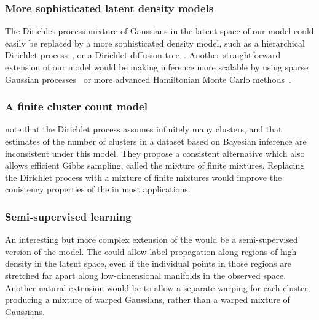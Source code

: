 \subsubsection{More sophisticated latent density models}
The Dirichlet process mixture of Gaussians in the latent space of our model could easily be replaced by a more sophisticated density model, such as a hierarchical Dirichlet process~\citep{teh2006hierarchical}, or a Dirichlet diffusion tree~\citep{neal2003density}.
Another straightforward extension of our model would be making inference more scalable by using sparse Gaussian processes~\citep{quinonero2005unifying,snelson2006sparse} or more advanced Hamiltonian Monte Carlo methods~\citep{zhang2011quasi}.


\subsubsection{A finite cluster count model}
\citet{miller2013inconsistent} note that the Dirichlet process assumes infinitely many clusters, and that estimates of the number of clusters in a dataset based on Bayesian inference are inconsistent under this model.
They propose a consistent alternative which also allows efficient Gibbs sampling, called the mixture of finite mixtures.
Replacing the Dirichlet process with a mixture of finite mixtures would improve the conistency properties of the \iwmm{} in most applications.




\subsubsection{Semi-supervised learning}

An interesting but more complex extension of the \iwmm{} would be a semi-supervised version of the model.
The \iwmm{} could allow label propagation along regions of high density in the latent space, even if the individual points in those regions are stretched far apart along low-dimensional manifolds in the observed space.
Another natural extension would be to allow a separate warping for each cluster, producing a mixture of warped Gaussians, rather than a warped mixture of Gaussians.%




